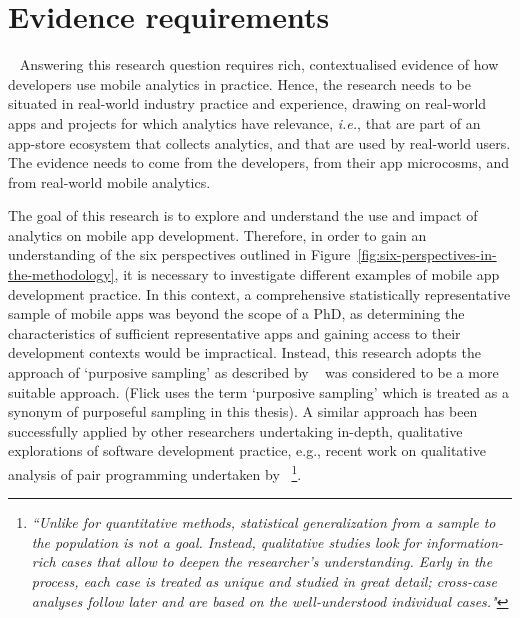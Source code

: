 \section{Evidence requirements}~\label{methodology-evidence-requirements}
Answering this research question requires rich, contextualised evidence of how developers use mobile analytics in practice.  
Hence, the research needs to be situated in real-world industry practice and experience, drawing on real-world apps and projects for which analytics have relevance, \textit{i.e.}, that are part of an app-store ecosystem that collects analytics, and that are used by real-world users. The evidence needs to come from the developers, from their app microcosms, and from real-world mobile analytics.




The goal of this research is to explore and understand the use and impact of analytics on mobile app development. %
Therefore, in order to gain an understanding of the six perspectives outlined in Figure~\ref{fig:six-perspectives-in-the-methodology}, it is necessary to investigate different examples of mobile app development practice. In this context, a comprehensive statistically representative sample of mobile apps was beyond the scope of a PhD, as determining the characteristics of sufficient representative apps and gaining access to their development contexts would be impractical. Instead, this research adopts the approach of `purposive sampling'  as described by ~\citep[pp180-182]{flick2018_an_introduction_to_qualitative_research_sixth_ed} was considered to be a more suitable approach. (Flick uses the term `purposive sampling' which is treated as a synonym of purposeful sampling in this thesis). A similar approach has been successfully applied by other researchers undertaking in-depth, qualitative explorations of software development practice, e.g., recent work on qualitative analysis of pair programming undertaken by ~\citep[p.114]{zieris2020_phd_qualitative_analysis_of_knowledge_transfer_in_pair_programming}\footnote{\emph{``Unlike for quantitative methods, statistical generalization from a sample to the population is not a goal. Instead, qualitative studies look for information-rich cases that allow to deepen the researcher’s understanding. Early in the process, each case is treated as unique and studied in great detail; cross-case analyses follow later and are based on the well-understood individual cases."}}. 

